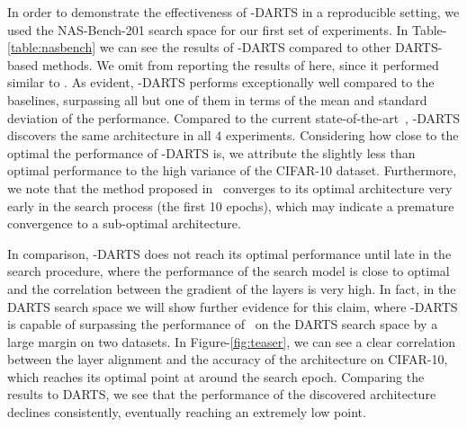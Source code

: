 \documentclass{article} \usepackage{fancyhdr, iclr2023_conference, times}
\newcommand{\mydarts}{-DARTS\xspace}
\newcommand{\lambdafn}{layer alignment\xspace}
\begin{document}
\par In order to demonstrate the effectiveness of \mydarts in a reproducible setting, we used the NAS-Bench-201 search space for our first set of experiments. In Table-\ref{table:nasbench} we can see the results of \mydarts compared to other DARTS-based methods. We omit from reporting the results of  here, since it performed similar to . As evident, \mydarts performs exceptionally well compared to the baselines, surpassing all but one of them in terms of the mean and standard deviation of the performance. Compared to the current state-of-the-art~\citep{DBLP:journals/corr/abs-2203-01665}, \mydarts discovers the same architecture in all 4 experiments. Considering how close to the optimal the performance of \mydarts is, we attribute the slightly less than optimal performance to the high variance of the CIFAR-10 dataset. Furthermore, we note that the method proposed in~\citep{DBLP:journals/corr/abs-2203-01665} converges to its optimal architecture very early in the search process (the first 10 epochs), which may indicate a premature convergence to a sub-optimal architecture. 
\par In comparison, \mydarts does not reach its optimal performance until late in the search procedure, where the performance of the search model is close to optimal and the correlation between the gradient of the layers is very high. In fact, in the DARTS search space we will show further evidence for this claim, where \mydarts is capable of surpassing the performance of~\citep{DBLP:journals/corr/abs-2203-01665} on the DARTS search space by a large margin on two datasets. In Figure-\ref{fig:teaser}, we can see a clear correlation between the \lambdafn and the accuracy of the architecture on CIFAR-10, which reaches its optimal point at around the  search epoch. Comparing the results to DARTS, we see that the performance of the discovered architecture declines consistently, eventually reaching an extremely low point. 
\end{document}
